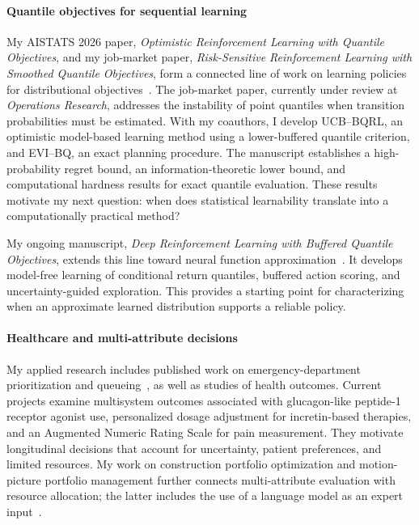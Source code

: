 \documentclass[11pt,letterpaper]{article}
\begin{document}
\paragraph{Quantile objectives for sequential learning}
My AISTATS 2026 paper, \emph{Optimistic Reinforcement Learning with Quantile
Objectives}, and my job-market paper, \emph{Risk-Sensitive Reinforcement
Learning with Smoothed Quantile Objectives}, form a connected line of work
on learning policies for distributional objectives~\cite{aistats,smoothed}.
The job-market paper, currently under review at \emph{Operations Research},
addresses the instability of point quantiles when transition probabilities
must be estimated. With my coauthors, I develop UCB--BQRL, an optimistic
model-based learning method using a lower-buffered quantile criterion, and
EVI--BQ, an exact planning procedure. The manuscript establishes a
high-probability regret bound, an information-theoretic lower bound, and
computational hardness results for exact quantile evaluation. These
results motivate my next question: when does statistical learnability
translate into a computationally practical method?

My ongoing manuscript, \emph{Deep Reinforcement Learning with Buffered
Quantile Objectives}, extends this line toward neural function
approximation~\cite{deep}. It develops model-free learning of conditional
return quantiles, buffered action scoring, and uncertainty-guided
exploration. This provides a starting point for characterizing when an
approximate learned distribution supports a reliable policy.

\paragraph{Healthcare and multi-attribute decisions}
My applied research includes published work on emergency-department
prioritization and queueing~\cite{ed}, as well as studies of health outcomes.
Current projects examine multisystem outcomes associated with glucagon-like
peptide-1 receptor agonist use, personalized dosage adjustment for
incretin-based therapies, and an Augmented Numeric Rating Scale for pain
measurement. They motivate longitudinal decisions that account for
uncertainty, patient preferences, and limited resources. My work on
construction portfolio optimization and motion-picture portfolio
management further connects multi-attribute evaluation with resource
allocation; the latter includes the use of a language model as an expert
input~\cite{portfolio}.
\end{document}

